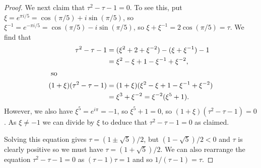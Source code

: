 \documentclass{amsart}
\renewcommand{\:}{\colon}
\theoremstyle{definition}
\begin{document}
\begin{proof}
 We next claim that $\tau^2-\tau-1=0$.  To see this, put
 $\xi=e^{\pi i/5}=\cos(\pi/5)+i\sin(\pi/5)$, so
 $\xi^{-1}=e^{-\pi i/5}=\cos(\pi/5)-i\sin(\pi/5)$, so
 $\xi+\xi^{-1}=2\cos(\pi/5)=\tau$.  We find that
 \begin{align*}
  \tau^2-\tau-1 &= (\xi^2+2+\xi^{-2}) - (\xi+\xi^{-1}) - 1 \\
                &= \xi^2 - \xi + 1 - \xi^{-1} + \xi^{-2}, \\
  \intertext{ so } 
  (1+\xi)(\tau^2-\tau-1) &=
    (1+\xi)(\xi^2 - \xi + 1 - \xi^{-1} + \xi^{-2}) \\
    &= \xi^3 + \xi^{-2} = \xi^{-2}(\xi^5 + 1).
 \end{align*}
 However, we also have $\xi^5=e^{i\pi}=-1$, so $\xi^5+1=0$, so 
 $(1+\xi)(\tau^2-\tau-1)=0$.  As $\xi\neq -1$ we can divide by $\xi$
 to deduce that $\tau^2-\tau-1=0$ as claimed.  

 Solving this equation gives $\tau=(1\pm\sqrt{5})/2$, but
 $(1-\sqrt{5})/2<0$ and $\tau$ is clearly positive so we must have
 $\tau=(1+\sqrt{5})/2$.  We can also rearrange the equation
 $\tau^2-\tau-1=0$ as $(\tau-1)\tau=1$ and so $1/(\tau-1)=\tau$.
\end{proof}
\end{document}
